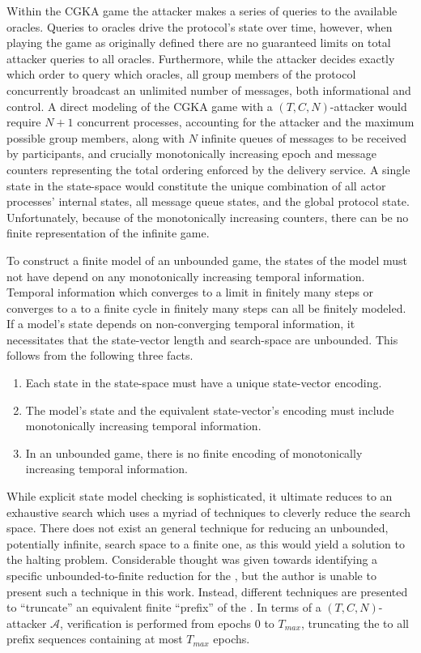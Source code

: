 Within the CGKA game the attacker makes a series of queries to the available oracles.
Queries to oracles drive the  protocol's state over time, however, when playing the game as originally defined there are no guaranteed limits on total attacker queries to all oracles.
Furthermore, while the attacker decides exactly which order to query which oracles, all group members of the  protocol concurrently broadcast an unlimited number of messages, both informational and control.
A direct modeling of the CGKA game with a \((T, C, N)\)-attacker would require \(N+1\) concurrent processes, accounting for the attacker and the maximum possible group members, along with \(N\) infinite queues of messages to be received by participants, and crucially monotonically increasing epoch and message counters representing the total ordering enforced by the delivery service.
A single state in the state-space would constitute the unique combination of all actor processes' internal states, all message queue states, and the global protocol state.
Unfortunately, because of the monotonically increasing counters, there can be no finite representation of the infinite game.

To construct a finite model of an unbounded game, the states of the model must not have depend on any monotonically increasing temporal information.
Temporal information which converges to a limit in finitely many steps or converges to a to a finite cycle in finitely many steps can all be finitely modeled.
If a model's state depends on non-converging temporal information, it necessitates that the state-vector length and search-space are unbounded.
This follows from the following three facts.

\begin{enumerate}
\def\labelenumi{\arabic{enumi}.}
\item
  Each state in the state-space must have a unique state-vector encoding.
\item
  The model's state and the equivalent state-vector's encoding must include monotonically increasing temporal information.
\item
  In an unbounded game, there is no finite encoding of monotonically increasing temporal information.
\end{enumerate}

While explicit state model checking is sophisticated, it ultimate reduces to an exhaustive search which uses a myriad of techniques to cleverly reduce the search space.
There does not exist an general technique for reducing an unbounded, potentially infinite, search space to a finite one, as this would yield a solution to the halting problem.
Considerable thought was given towards identifying a specific unbounded-to-finite reduction for the \CGKAsec, but the author is unable to present such a technique in this work.
Instead, different techniques are presented to ``truncate'' an equivalent finite ``prefix'' of the \CGKAsec.
In terms of a \((T, C, N)\)-attacker \(\mathcal{A}\), verification is performed from epochs $0$ to \(T_{max}\), truncating the \CGKAsec to all prefix sequences containing at most \(T_{max}\) epochs.

